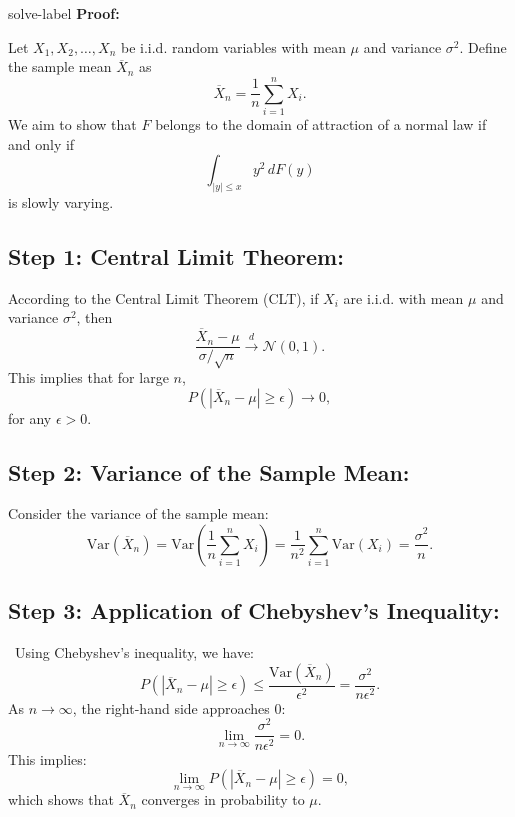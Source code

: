 	\begin{solve}{}{solve-label}
\textbf{Proof:}

Let \( X_1, X_2, \ldots, X_n \) be i.i.d. random variables with mean \( \mu \) and variance \( \sigma^2 \). Define the sample mean \( \overline{X}_n \) as \[ \overline{X}_n = \frac{1}{n} \sum_{i=1}^{n} X_i. \] We aim to show that \( F \) belongs to the domain of attraction of a normal law if and only if \[ \int_{|y| \leq x} y^2 \, dF(y) \] is slowly varying.
 \subsection*{Step 1: Central Limit Theorem:}
 According to the Central Limit Theorem (CLT), if \( X_i \) are i.i.d. with mean \( \mu \) and variance \( \sigma^2 \), then \[ \frac{\overline{X}_n - \mu}{\sigma / \sqrt{n}} \xrightarrow{d} \mathcal{N}(0, 1). \] This implies that for large \( n \), \[ P\left( \left| \overline{X}_n - \mu \right| \geq \epsilon \right) \to 0, \] for any \( \epsilon > 0 \).
 \subsection*{Step 2: Variance of the Sample Mean:} 
 Consider the variance of the sample mean: \[ \text{Var}(\overline{X}_n) = \text{Var}\left( \frac{1}{n} \sum_{i=1}^{n} X_i \right) = \frac{1}{n^2} \sum_{i=1}^{n} \text{Var}(X_i) = \frac{\sigma^2}{n}. \] 
 \subsection*{Step 3: Application of Chebyshev's Inequality:}\
 Using Chebyshev's inequality, we have: \[ P\left( \left| \overline{X}_n - \mu \right| \geq \epsilon \right) \leq \frac{\text{Var}(\overline{X}_n)}{\epsilon^2} = \frac{\sigma^2}{n \epsilon^2}. \] As \( n \to \infty \), the right-hand side approaches 0: \[ \lim_{n \to \infty} \frac{\sigma^2}{n \epsilon^2} = 0. \] This implies: \[ \lim_{n \to \infty} P\left( \left| \overline{X}_n - \mu \right| \geq \epsilon \right) = 0, \] which shows that \( \overline{X}_n \) converges in probability to \( \mu \). 

\end{solve}
